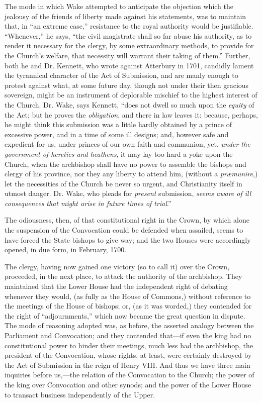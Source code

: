 The mode in which Wake
attempted to anticipate the objection which the jealousy of the
friends of liberty made against his statements, was to maintain that,
in ``an extreme case,'' resistance to the royal authority would be
justifiable. ``Whenever,'' he says, ``the civil magistrate shall so far
abuse his authority, as to render it necessary for the clergy, by some
extraordinary methods, to provide for the Church's welfare, that
necessity will warrant their taking of them.'' Further, both he and Dr.
Kennett, who wrote against Atterbury in 1701, candidly lament the
tyrannical character of the Act of Submission, and are manly enough to
protest against what, at some future day, though not under their then
gracious sovereign, might be an instrument of deplorable mischief to
the highest interest of the Church. Dr. Wake, says Kennett, ``does not
dwell so much upon the \emph{equity} of the Act; but he proves the \emph{obligation},
and there in law leaves it: because, perhaps, he might think this
submission was a little hardly obtained by a prince of excessive
power, and in a time of some ill designs; and, however safe and
expedient for us, under princes of our own faith and communion, yet, \emph{under
the government of heretics and heathens}, it may lay too hard a
yoke upon the Church, when the archbishop shall have no power to
assemble the bishops and clergy of his province, nor they any liberty
to attend him, (without a \emph{præmunire},) let the necessities of
the Church be never so urgent, and Christianity itself in utmost
danger. Dr. Wake, who pleads for \emph{present} submission, \emph{seems
aware of ill consequences that might arise in future times of trial}.''

The odiousness, then, of that
constitutional right in the Crown, by which alone the suspension
of the Convocation could be defended when assailed, seems to have
forced the State bishops to give way; and the two Houses were
accordingly opened, in due form, in February, 1700.

The clergy, having now gained
one victory (so to call it) over the Crown, proceeded, in the next
place, to attack the authority of the archbishop. They maintained that
the Lower House had the independent right of debating whenever they
would, (as fully as the House of Commons,) without reference to the
meetings of the House of bishops; or, (as it was worded,) they
contended for the right of ``adjournments,'' which now became the great
question in dispute. The mode of reasoning adopted was, as before, the
asserted analogy between the Parliament and Convocation; and they
contended that—if even the king had no constitutional power to
hinder their meetings, much less had the archbishop, the president of
the Convocation, whose rights, at least, were certainly destroyed by
the Act of Submission in the reign of Henry VIII. And thus we have
three main inquiries before us,—the relation of the Convocation to
the Church; the power of the king over Convocation and other synods;
and the power of the Lower House to transact business independently of
the Upper.

